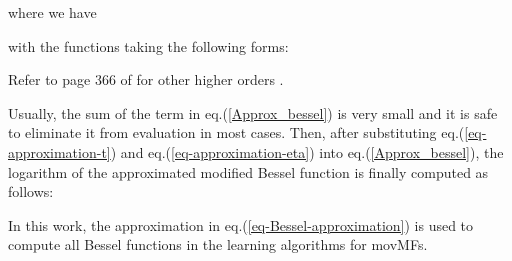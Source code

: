 \documentclass[11pt]{article}
\begin{document}
where we have 


with the functions  taking the following forms:
 

Refer to page 366 of \cite{Abramowitz_1964} for other  higher orders . 

Usually, the sum of the term  in eq.(\ref{Approx_bessel}) is very small and it is safe to eliminate it from evaluation in most cases. Then, after substituting eq.(\ref{eq-approximation-t}) and eq.(\ref{eq-approximation-eta}) into eq.(\ref{Approx_bessel}), the logarithm of the approximated modified Bessel function is finally computed  as follows:


In this work, the approximation in eq.(\ref{eq-Bessel-approximation}) is used to compute all Bessel functions in the learning algorithms for movMFs. 
\end{document}

